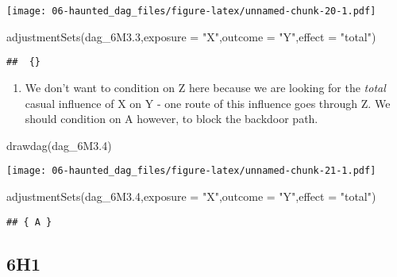 \documentclass[
]{book}
\newenvironment{Shaded}{\begin{snugshade}}{\end{snugshade}}
\newcommand{\AttributeTok}[1]{\textcolor[rgb]{0.77,0.63,0.00}{#1}}
\newcommand{\FloatTok}[1]{\textcolor[rgb]{0.00,0.00,0.81}{#1}}
\newcommand{\FunctionTok}[1]{\textcolor[rgb]{0.00,0.00,0.00}{#1}}
\newcommand{\NormalTok}[1]{#1}
\newcommand{\StringTok}[1]{\textcolor[rgb]{0.31,0.60,0.02}{#1}}
\providecommand{\tightlist}{%
  \setlength{\itemsep}{0pt}\setlength{\parskip}{0pt}}
\begin{document}
\texttt{[image: 06-haunted\_dag\_files/figure-latex/unnamed-chunk-20-1.pdf]}

\begin{Shaded}
\begin{Highlighting}[]
\FunctionTok{adjustmentSets}\NormalTok{(dag\_6M3}\FloatTok{.3}\NormalTok{,}\AttributeTok{exposure =} \StringTok{"X"}\NormalTok{,}\AttributeTok{outcome =} \StringTok{"Y"}\NormalTok{,}\AttributeTok{effect =} \StringTok{"total"}\NormalTok{)}
\end{Highlighting}
\end{Shaded}

\begin{verbatim}
##  {}
\end{verbatim}

\begin{enumerate}
\def\labelenumi{\arabic{enumi}.}
\setcounter{enumi}{3}
\tightlist
\item
  We don't want to condition on Z here because we are looking for the \emph{total} casual influence of X on Y - one route of this influence goes through Z. We should condition on A however, to block the backdoor path.
\end{enumerate}

\begin{Shaded}
\begin{Highlighting}[]
\FunctionTok{drawdag}\NormalTok{(dag\_6M3}\FloatTok{.4}\NormalTok{)}
\end{Highlighting}
\end{Shaded}

\texttt{[image: 06-haunted\_dag\_files/figure-latex/unnamed-chunk-21-1.pdf]}

\begin{Shaded}
\begin{Highlighting}[]
\FunctionTok{adjustmentSets}\NormalTok{(dag\_6M3}\FloatTok{.4}\NormalTok{,}\AttributeTok{exposure =} \StringTok{"X"}\NormalTok{,}\AttributeTok{outcome =} \StringTok{"Y"}\NormalTok{,}\AttributeTok{effect =} \StringTok{"total"}\NormalTok{)}
\end{Highlighting}
\end{Shaded}

\begin{verbatim}
## { A }
\end{verbatim}

\hypertarget{h1-2}{%
\subsection*{6H1}\label{h1-2}}
\end{document}
